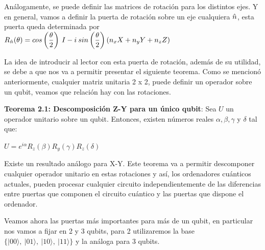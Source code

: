  Análogamente, se puede definir las matrices de rotación para los distintos ejes. Y en general, vamos a definir la puerta de rotación sobre un eje cualquiera $\Hat{n}$, esta puerta queda determinada por $R_{\Hat{n}}(\theta) = cos \left(\dfrac{\theta}{2}\right)\:I - i\:sin\left(\dfrac{\theta}{2}\right)\left(n_{x}X + n_{y}Y + n_{z}Z\right) $ \newline

 La idea de introducir al lector con esta puerta de rotación, además de su utilidad, se debe a que nos va a permitir presentar el siguiente teorema. Como se mencionó anteriormente, cualquier matriz unitaria 2 x 2, puede definir un operador sobre un qubit, veamos que relación hay con las rotaciones. \newline
 
 \textbf{Teorema 2.1: Descomposición Z-Y para un único qubit}\cite{B:Nielsen:2002}: Sea $U$ un operador unitario sobre un qubit. Entonces, existen números reales $\alpha,\beta,\gamma$ y $\delta$ tal que:
 \begin{center}
     $U = e^{i\alpha} R_{z}(\beta)R_{y}(\gamma)R_{z}(\delta)$
 \end{center}

 Existe un resultado análogo para X-Y. Este teorema va a permitir descomponer cualquier operador unitario en estas rotaciones y así, los ordenadores cuánticos actuales, pueden procesar cualquier circuito independientemente de las diferencias entre puertas que componen el circuito cuántico y las puertas que dispone el ordenador.\cite{Note:Martin} \newline

 Veamos ahora las puertas más importantes para más de un qubit, en particular nos vamos a fijar en 2 y 3 qubits, para 2 utilizaremos la base $\{|00\rangle,\:|01\rangle,\:|10\rangle,\:|11\rangle\}$ y la análoga para 3 qubits.


